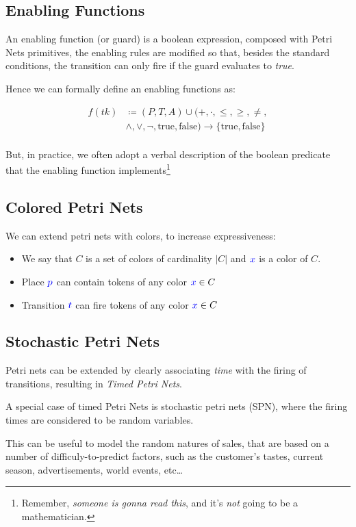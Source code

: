\documentclass[openright, twoside, twocolumn]{report}
\begin{document}
    \subsection{Enabling Functions}

    An enabling function (or guard) is a boolean expression, composed with Petri Nets primitives, the enabling rules
    are modified so that, besides the standard conditions, the transition can only fire if the guard evaluates to
    \emph{true}.

    Hence we can formally define an enabling functions as:

\begin{align*}
  f(tk) &\coloneqq (P, T, A) \cup (+, \cdot, \leq, \geq, \neq, \\
  & \land, \lor, \neg, \text{true}, \text{false}) \to \{ \text{true}, \text{false} \}\\
\end{align*}

But, in practice, we often adopt a verbal description of the boolean predicate that the enabling function implements\footnote{%
  Remember, \emph{someone is gonna read this}, and it's \emph{not} going to be a mathematician.
}

  \subsection{Colored Petri Nets}

  We can extend petri nets with colors, to increase expressiveness:

  \begin{itemize}
    \item We say that $C$ is a set of colors of cardinality $|C|$ and $\textcolor{blue}{x}$ is a color of $C$.
    \item Place $\textcolor{blue}{p}$ can contain tokens of any color $\textcolor{blue}{x} \in  C $
    \item Transition $\textcolor{blue}{t}$ can fire tokens of any color $\textcolor{blue}{x} \in C$
  \end{itemize}

  \subsection{Stochastic Petri Nets}

  Petri nets can be extended by clearly associating \emph{time} with the firing of transitions,
  resulting in \emph{Timed Petri Nets}.

  A special case of timed Petri Nets is stochastic petri nets (SPN), where the firing times are
  considered to be random variables.

  This can be useful to model the random natures of sales, that are based on a number of
  difficuly-to-predict factors, such as the customer's tastes, current season, advertisements,
  world events, etc\dots
\end{document}
